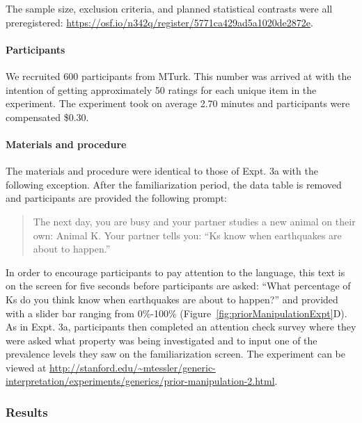 \documentclass[,man,floatsintext]{apa6}
\let\oldparagraph\paragraph
\renewcommand{\paragraph}[1]{\oldparagraph{#1}\mbox{}}
\theoremstyle{definition}
\theoremstyle{definition}
\theoremstyle{definition}
\theoremstyle{remark}
\begin{document}
The sample size, exclusion criteria, and planned statistical contrasts
were all preregistered:
\url{https://osf.io/n342q/register/5771ca429ad5a1020de2872e}.

\hypertarget{participants-5}{%
\paragraph{Participants}\label{participants-5}}

We recruited 600 participants from MTurk. This number was arrived at
with the intention of getting approximately 50 ratings for each unique
item in the experiment. The experiment took on average 2.70 minutes and
participants were compensated \$0.30.

\hypertarget{materials-and-procedure}{%
\paragraph{Materials and procedure}\label{materials-and-procedure}}

The materials and procedure were identical to those of Expt. 3a with the
following exception. After the familiarization period, the data table is
removed and participants are provided the following prompt:

\begin{quote}
The next day, you are busy and your partner studies a new animal on
their own: Animal K. Your partner tells you: \enquote{Ks know when
earthquakes are about to happen.}
\end{quote}

In order to encourage participants to pay attention to the language,
this text is on the screen for five seconds before participants are
asked: \enquote{What percentage of Ks do you think know when earthquakes
are about to happen?} and provided with a slider bar ranging from
0\%-100\% (Figure~\ref{fig:priorManipulationExpt}D). As in Expt. 3a,
participants then completed an attention check survey where they were
asked what property was being investigated and to input one of the
prevalence levels they saw on the familiarization screen. The experiment
can be viewed at
\url{http://stanford.edu/~mtessler/generic-interpretation/experiments/generics/prior-manipulation-2.html}.

\hypertarget{results-4}{%
\subsubsection{Results}\label{results-4}}
\end{document}

